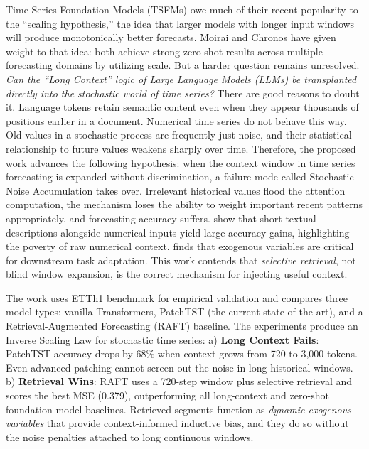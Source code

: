 \documentclass{article} %
\begin{document}
Time Series Foundation Models (TSFMs) owe much of their recent popularity to the ``scaling hypothesis,'' the idea that larger models with longer input windows will produce monotonically better forecasts. Moirai \citep{woo2024unified} and Chronos \citep{ansari2024chronos} have given weight to that idea: both achieve strong zero-shot results across multiple forecasting domains by utilizing scale. But a harder question remains unresolved. \textit{Can the ``Long Context'' logic of Large Language Models (LLMs) be transplanted directly into the stochastic world of time series?} There are good reasons to doubt it. Language tokens retain semantic content even when they appear thousands of positions earlier in a document. Numerical time series do not behave this way. Old values in a stochastic process are frequently just noise, and their statistical relationship to future values weakens sharply over time. Therefore, the proposed work advances the following hypothesis: when the context window in time series forecasting is expanded without discrimination, a failure mode called Stochastic Noise Accumulation takes over. Irrelevant historical values flood the attention computation, the mechanism loses the ability to weight important recent patterns appropriately, and forecasting accuracy suffers. \cite{williams2025context} show that short textual descriptions alongside numerical inputs yield large accuracy gains, highlighting the poverty of raw numerical context. \cite{arango2025chronosx} finds that exogenous variables are critical for downstream task adaptation. This work contends that \textit{selective retrieval}, not blind window expansion, is the correct mechanism for injecting useful context. 

The work uses ETTh1 benchmark for empirical validation and compares three model types: vanilla Transformers, PatchTST \citep{nie2023time} (the current state-of-the-art), and a Retrieval-Augmented Forecasting (RAFT) baseline. The experiments produce an Inverse Scaling Law for stochastic time series: a) \textbf{Long Context Fails}: PatchTST accuracy drops by 68\% when context grows from 720 to 3,000 tokens. Even advanced patching cannot screen out the noise in long historical windows. b) \textbf{Retrieval Wins}: RAFT \citep{han2025raft} uses a 720-step window plus selective retrieval and scores the best MSE (0.379), outperforming all long-context and zero-shot foundation model baselines.
Retrieved segments function as \textit{dynamic exogenous variables} that provide context-informed inductive bias, and they do so without the noise penalties attached to long continuous windows.
\end{document}
